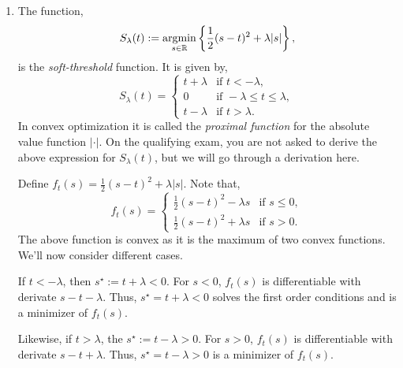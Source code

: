 \begin{enumerate}[label = (\alph*)]
    \item The function,
    \[S_\lambda(t) := \operatorname*{argmin}_{s \in \mathbb{R}} \left\{\frac{1}{2}(s-t)^2 + \lambda |s|\right\}, \]
    is the \emph{soft-threshold} function. It is given by,
    \[S_\lambda(t) = \begin{cases}
        t+\lambda &\text{if } t <-\lambda,\\
        0 & \text{if } -\lambda \le t \le \lambda, \\
        t-\lambda & \text{if } t  > \lambda.
    \end{cases} \] 
    In convex optimization it is called the \emph{proximal function} for the absolute value function $|\cdot|$. On the qualifying exam, you are not asked to derive the above expression for $S_\lambda(t)$, but we will go through a derivation here.

    Define $f_t(s) = \frac{1}{2}(s-t)^2 + \lambda |s|$. Note that,
    \[f_t(s) = \begin{cases}
        \frac{1}{2}(s-t)^2 - \lambda s & \text{if } s \le 0,\\
        \frac{1}{2}(s-t)^2 + \lambda s & \text{if } s > 0.
    \end{cases} \]
    The above function is convex as it is the maximum of two convex functions. We'll now consider different cases. 
    
    If $t < -\lambda$, then $s^\star := t+\lambda < 0$. For $s<0$, $f_t(s)$ is differentiable with derivate $s-t - \lambda$. Thus, $s^\star = t+\lambda<0$ solves the first order conditions and is a minimizer of $f_t(s)$.

    Likewise, if $t>\lambda$, the $s^\star := t-\lambda > 0$. For $s>0$, $f_t(s)$ is differentiable with derivate $s-t+\lambda$. Thus, $s^\star = t-\lambda >0$ is a minimizer of $f_t(s)$. 


\end{enumerate}
